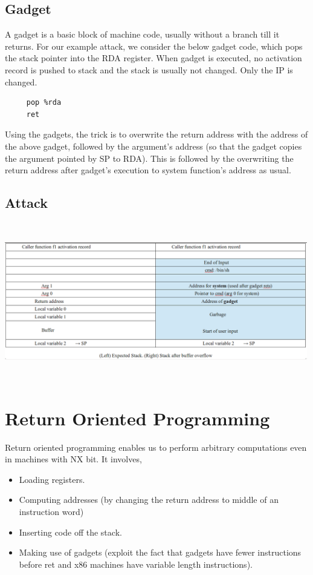 \documentclass[11pt]{article} %
\begin{document}
\subsection {Gadget}
A gadget is a basic block of machine code, usually without a branch till it
returns. For our example attack, we consider the below gadget code, which pops
the stack pointer into the RDA register. When gadget is executed, no activation
record is pushed to stack and the stack is usually not changed. Only the IP is changed.

\begin{verbatim}
     pop %rda
     ret
\end{verbatim}

Using the gadgets, the trick is to overwrite the return address with the
address of the above gadget, followed by the argument's address (so that the
gadget copies the argument pointed by SP to RDA). This is followed by the overwriting
the return address after gadget's execution to system function's address as
usual.

\subsection {Attack}
\begin{center}
\includegraphics [width=500px,height=260px] {img/img5.png}
\end{center}

\section {Return Oriented Programming}
Return oriented programming enables us to perform arbitrary computations even
in machines with NX bit. It involves,
\begin {itemize}  \itemsep -2pt
\item Loading registers.
\item Computing addresses (by changing the return address to middle of an instruction word)
\item Inserting code off the stack.
\item Making use of gadgets (exploit the fact that gadgets have fewer instructions before ret and x86 machines have variable length instructions).
\end {itemize}
\end{document}
